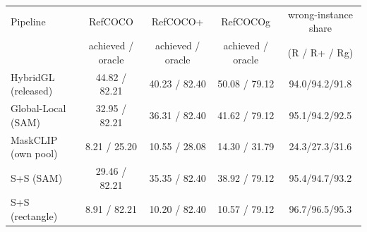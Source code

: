 \begin{tabular}{lccc c}
\toprule
Pipeline & RefCOCO & RefCOCO+ & RefCOCOg & wrong-instance share \\
 & achieved / oracle & achieved / oracle & achieved / oracle & (R / R+ / Rg) \\
\midrule
HybridGL (released) & 44.82 / 82.21 & 40.23 / 82.40 & 50.08 / 79.12 & 94.0/94.2/91.8 \\
Global-Local (SAM) & 32.95 / 82.21 & 36.31 / 82.40 & 41.62 / 79.12 & 95.1/94.2/92.5 \\
MaskCLIP (own pool) & 8.21 / 25.20 & 10.55 / 28.08 & 14.30 / 31.79 & 24.3/27.3/31.6 \\
S+S (SAM) & 29.46 / 82.21 & 35.35 / 82.40 & 38.92 / 79.12 & 95.4/94.7/93.2 \\
S+S (rectangle) & 8.91 / 82.21 & 10.20 / 82.40 & 10.57 / 79.12 & 96.7/96.5/95.3 \\
\bottomrule
\end{tabular}
